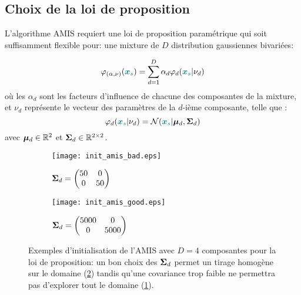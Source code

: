 \subsection{Choix de la loi de proposition}

L'algorithme AMIS requiert une loi de proposition paramétrique qui soit suffisamment flexible pour:
 une mixture de $D$ distribution gaussiennes bivariées:

\begin{equation}
\varphi_{(\alpha,\nu)}(\NdFS{\PosSource}) = \sum\limits_{d=1}^D \alpha_d \varphi_d(\NdFS{\PosSource} | \nu_d)
\label{eq_AE_21}
\end{equation}
où les $\alpha_d$ sont les facteurs d'influence de chacune des composantes de la mixture, et $\nu_d$ représente le vecteur des paramètres de la $d$-ième composante, telle que : 
\begin{equation}
\varphi_d(\NdFS{\PosSource} | \nu_d) = \mathcal{N}(\NdFS{\PosSource} | \VecMu_d, \MatSigma_d)
\label{eq_AE_21_bis}
\end{equation}
avec ${\bm{\mu}}_d \in \mathbb{R}^2$ et ${\bm{\Sigma}}_d \in \mathbb{R}^{2\times2}$.

 \begin{figure}[h!]
 	\centering
 	\begin{subfigure}[t]{0.5\textwidth}
 		\centering
 		\texttt{[image: init\_amis\_bad.eps]}
 		\caption{${\bm{\Sigma}}_d = 
 			\begin{pmatrix}
 			50 & 0 \\
 			0 & 50
 			\end{pmatrix}$}
 		\label{init_amis_bad}
 	\end{subfigure}%
 	\begin{subfigure}[t]{0.5\textwidth}
 		\centering
 		\texttt{[image: init\_amis\_good.eps]}
 		\caption{${\bm{\Sigma}}_d = 
 			\begin{pmatrix}
 			5000 & 0 \\
 			0 & 5000
 			\end{pmatrix}$}
 		\label{init_amis_good}
 	\end{subfigure}
 	\caption{Exemples d'initialisation de l'AMIS avec $D=4$ composantes pour la loi de proposition: un bon choix des ${\bm{\Sigma}}_d$ permet un tirage homogène sur le domaine (\ref{init_amis_good}) tandis qu'une covariance trop faible ne permettra pas d'explorer tout le domaine (\ref{init_amis_bad}).}
 	 \label{fig_init_amis}	
 \end{figure}
 
